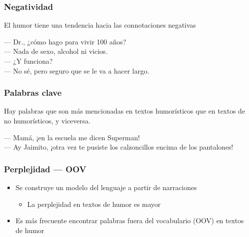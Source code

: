 \begin{frame}
    \frametitle{Negatividad}
    
    El humor tiene una tendencia hacia las connotaciones negativas

    \begin{example}
        --- Dr., ¿cómo hago para vivir 100 años? \\
        --- Nada de sexo, alcohol ni vicios. \\
        --- ¿Y funciona? \\
        --- No sé, pero seguro que se le va a hacer largo.
    \end{example}
\end{frame}

\begin{frame}
    \frametitle{Palabras clave}
    
    Hay palabras que son más mencionadas en textos humorísticos que en textos de no humorísticos, y viceversa.
    
    \begin{example}
        --- Mamá, ¡en la escuela me dicen Superman! \\
        --- Ay Jaimito, ¡otra vez te pusiste los calzoncillos encima de los pantalones!
    \end{example}
\end{frame}

\begin{frame}
    \frametitle{Perplejidad --- OOV}
    
    \begin{itemize}
        \item Se construye un modelo del lenguaje a partir de narraciones

        \begin{itemize}
            \item La perplejidad en textos de humor es mayor
        \end{itemize}

        \item Es más frecuente encontrar palabras fuera del vocabulario (OOV) en textos de humor
    \end{itemize}
\end{frame}

